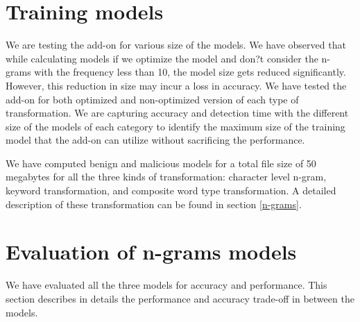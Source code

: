 \section{Training models}

We are testing the add-on for various size of the models.  We have observed that while calculating models if we optimize the model and don?t consider the n-grams with the frequency less than 10, the model size gets reduced significantly. However, this reduction in size may incur a loss in accuracy. We have tested the add-on for both optimized and non-optimized version of each type of transformation. We are capturing accuracy and detection time with the different size of the models of each category to identify the maximum size of the training model that the add-on can utilize without sacrificing the performance. 

We have computed benign and malicious models for a total file size of 50 megabytes for all the three kinds of transformation: character level n-gram, keyword transformation, and composite word type transformation.  A detailed description of these transformation can be found in section \ref{n-grams}. 

\section{Evaluation of n-grams models}

We have evaluated all the three models for accuracy and performance. This section describes in details the performance and accuracy trade-off in between the models.








